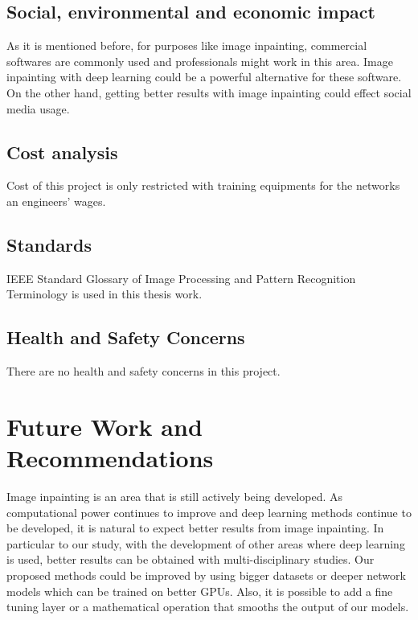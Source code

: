 \subsection{Social, environmental and economic impact}

As it is mentioned before, for purposes like image inpainting, commercial softwares are commonly used and professionals might work in this area. Image inpainting with deep learning could be a powerful alternative for these software. On the other hand, getting better results with image inpainting could effect social media usage. 

\subsection{Cost analysis}

Cost of this project is only restricted with training equipments for the networks an engineers' wages.

\subsection{Standards}

IEEE Standard Glossary of Image Processing and Pattern Recognition Terminology is used in this thesis work.

\subsection{Health and Safety Concerns}

There are no health and safety concerns in this project.

\section{Future Work and Recommendations}

Image inpainting is an area that is still actively being developed. As computational power continues to improve and deep learning methods continue to be developed, it is natural to expect better results from image inpainting. In particular to our study, with the development of other areas where deep learning is used, better results can be obtained with multi-disciplinary studies. Our proposed methods could be improved by using bigger datasets or deeper network models which can be trained on better GPUs. Also, it is possible to add a fine tuning layer or a mathematical operation that smooths the output of our models.